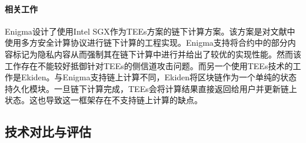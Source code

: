 \paragraph{相关工作} 
Enigma\cite{enigma2019}设计了使用Intel SGX作为TEEs方案的链下计算方案。该方案是对文献\cite{2015arXiv150603471Z}中使用多方安全计算协议进行链下计算的工程实现。Enigma支持将合约中的部分内容标记为隐私内容从而强制其在链下计算中进行并给出了较优的实现性能。然而该工作存在不能较好抵御针对TEEs的侧信道攻击问题\cite{217543}。而另一个使用TEEs技术的工作是Ekiden\cite{2018arXiv180405141C}。与Enigma支持链上计算不同，Ekiden将区块链作为一个单纯的状态持久化模块。一旦链下计算完成，TEEs会将计算结果直接返回给用户并更新链上状态。这也导致这一框架存在不支持链上计算的缺点。

\newpage
\subsection{技术对比与评估}
